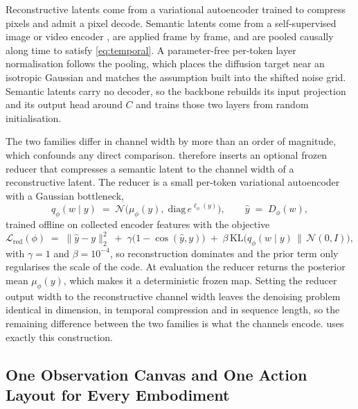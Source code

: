Reconstructive latents come from a variational autoencoder trained to compress
pixels \citep{kingma2014vae,rombach2022ldm} and admit a pixel decode. Semantic
latents come from a self-supervised image or video encoder
\citep{simeoni2025dinov3,assran2025vjepa2}, are applied frame by frame, and are
pooled causally along time to satisfy \eqref{eq:temporal}. A parameter-free
per-token layer normalisation follows the pooling, which places the diffusion
target near an isotropic Gaussian and matches the assumption built into the
shifted noise grid. Semantic latents carry no decoder, so the backbone rebuilds
its input projection and its output head around $C$ and trains those two layers
from random initialisation.

The two families differ in channel width by more than an order of magnitude,
which confounds any direct comparison. \sys{} therefore inserts an optional
frozen reducer that compresses a semantic latent to the channel width of a
reconstructive latent. The reducer is a small per-token variational autoencoder
with a Gaussian bottleneck,
\begin{equation}
  q_\phi(w \mid y) \;=\; \mathcal{N}\!\big(\mu_\phi(y),\; \mathrm{diag}\,e^{\ell_\phi(y)}\big),
  \qquad \hat{y} \;=\; D_\phi(w),
  \label{eq:svaepost}
\end{equation}
trained offline on collected encoder features with the objective
\begin{equation}
  \mathcal{L}_{\text{red}}(\phi)
  \;=\;
  \big\| \hat{y} - y \big\|_2^2
  \;+\; \gamma \big(1 - \cos(\hat{y}, y)\big)
  \;+\; \beta \, \mathrm{KL}\!\big(q_\phi(w \mid y) \,\|\, \mathcal{N}(0, I)\big),
  \label{eq:svae}
\end{equation}
with $\gamma = 1$ and $\beta = 10^{-4}$, so reconstruction dominates and the
prior term only regularises the scale of the code. At evaluation the reducer
returns the posterior mean $\mu_\phi(y)$, which makes it a deterministic frozen
map. Setting the reducer output width to the reconstructive channel width leaves
the denoising problem identical in dimension, in temporal compression and in
sequence length, so the remaining difference between the two families is what the
channels encode.  uses exactly this construction.

\subsection{One Observation Canvas and One Action Layout for Every Embodiment}
\label{sec:contract}

